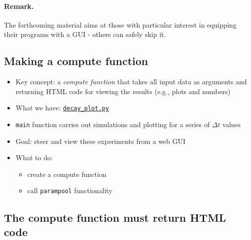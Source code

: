\documentclass[%
oneside,                 %
final,                   %
10pt]{article}
\begin{document}
\noindent

\paragraph{Remark.}
The forthcoming material aims at those with particular interest in
equipping their programs with a GUI - others can safely skip it.



\subsection*{Making a compute function}

\begin{itemize}
 \item Key concept: a \emph{compute function} that takes all input data as arguments
   and returning HTML code for viewing the results (e.g., plots and numbers)

 \item What we have: \href{{http://tinyurl.com/ofkw6kc/softeng/decay_plot.py}}{\nolinkurl{decay_plot.py}}

 \item \texttt{main} function carries out simulations and plotting for a
   series of $\Delta t$ values

 \item Goal: steer and view these experiments from a web GUI

 \item What to do:
\begin{itemize}

   \item create a compute function

   \item call \texttt{parampool} functionality
\end{itemize}

\noindent
\end{itemize}

\noindent
\subsection*{The compute function must return HTML code}
\end{document}
